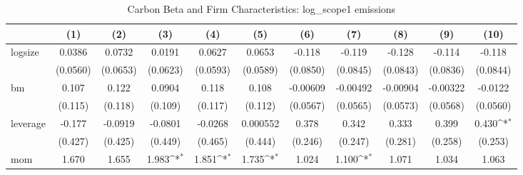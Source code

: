 \begin{table}[htbp]\centering
\def\sym#1{\ifmmode^{#1}\else\(^{#1}\)\fi}
\caption{Carbon Beta and Firm Characteristics: log\_scope1 emissions}
\begin{tabular}{l*{10}{c}}
\hline\hline
                    &\multicolumn{1}{c}{(1)}         &\multicolumn{1}{c}{(2)}         &\multicolumn{1}{c}{(3)}         &\multicolumn{1}{c}{(4)}         &\multicolumn{1}{c}{(5)}         &\multicolumn{1}{c}{(6)}         &\multicolumn{1}{c}{(7)}         &\multicolumn{1}{c}{(8)}         &\multicolumn{1}{c}{(9)}         &\multicolumn{1}{c}{(10)}         \\
\hline
logsize             &      0.0386         &      0.0732         &      0.0191         &      0.0627         &      0.0653         &      -0.118         &      -0.119         &      -0.128         &      -0.114         &      -0.118         \\
                    &    (0.0560)         &    (0.0653)         &    (0.0623)         &    (0.0593)         &    (0.0589)         &    (0.0850)         &    (0.0845)         &    (0.0843)         &    (0.0836)         &    (0.0844)         \\
[1em]
bm                  &       0.107         &       0.122         &      0.0904         &       0.118         &       0.108         &    -0.00609         &    -0.00492         &    -0.00904         &    -0.00322         &     -0.0122         \\
                    &     (0.115)         &     (0.118)         &     (0.109)         &     (0.117)         &     (0.112)         &    (0.0567)         &    (0.0565)         &    (0.0573)         &    (0.0568)         &    (0.0560)         \\
[1em]
leverage            &      -0.177         &     -0.0919         &     -0.0801         &     -0.0268         &    0.000552         &       0.378         &       0.342         &       0.333         &       0.399         &       0.430\sym{*}  \\
                    &     (0.427)         &     (0.425)         &     (0.449)         &     (0.465)         &     (0.444)         &     (0.246)         &     (0.247)         &     (0.281)         &     (0.258)         &     (0.253)         \\
[1em]
mom                 &       1.670         &       1.655         &       1.983\sym{*}  &       1.851\sym{*}  &       1.735\sym{*}  &       1.024         &       1.100\sym{*}  &       1.071         &       1.034         &       1.063         \\

\end{tabular}
\end{table}
